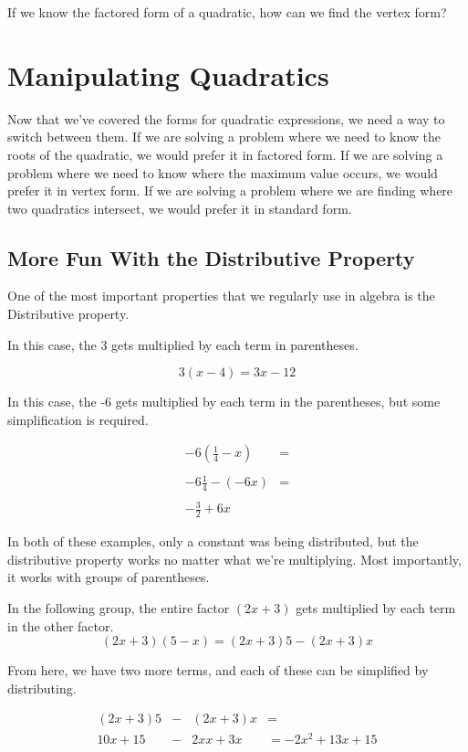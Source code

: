 \begin{prblm}
If we know the factored form of a quadratic, how can we find the vertex form?
\end{prblm}

\section*{Manipulating Quadratics}

Now that we've covered the forms for quadratic expressions, we need a way to switch between them.  If we are solving a problem where we need to know the roots of the quadratic, we would prefer it in factored form.  If we are solving a problem where we need to know where the maximum value occurs, we would prefer it in vertex form.  If we are solving a problem where we are finding where two quadratics intersect, we would prefer it in standard form.

\subsection*{More Fun With the Distributive Property}

One of the most important properties that we regularly use in algebra is the Distributive property.

\begin{example}

In this case, the 3 gets multiplied by each term in parentheses.

$$3(x-4) = 3x - 12$$

In this case, the -6 gets multiplied by each term in the parentheses, but some simplification is required.

$$\begin{array}{rl}
-6(\frac{1}{4}- x) & = \\ & \\
-6\frac{1}{4} -(-6x) & = \\ & \\
-\frac{3}{2} + 6x\end{array}$$

\end{example}

In both of these examples, only a constant was being distributed, but the distributive property works no matter what we're multiplying.  Most importantly, it works with groups of parentheses.

\begin{example}

In the following group, the entire factor $(2x + 3)$ gets multiplied by each term in the other factor.
$$(2x + 3)(5-x) = (2x+3)5 - (2x+3)x$$

From here, we have two more terms, and each of these can be simplified by distributing.

$$\begin{array}{rcll}
(2x + 3)5 & - & (2x + 3)x & = \\
10x+15 & - & 2xx+3x & = -2x^2 + 13x + 15\end{array}$$
\end{example}

